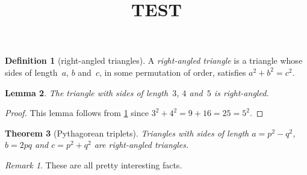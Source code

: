 \documentclass[]{resume-style}
\begin{document}
    \newtheorem{theorem}{Theorem}
    \newtheorem{corollary}[theorem]{Corollary}
    \newtheorem{lemma}[theorem]{Lemma}
    \theoremstyle{definition}
    \newtheorem{definition}[theorem]{Definition}
    \theoremstyle{remark}
    \newtheorem{remark}{Remark}

    \title{TEST}

    \begin{definition}[right-angled triangles] \label{def:tri}
    A \emph{right-angled triangle} is a triangle whose sides of length~\(a\), \(b\) and~\(c\), in some permutation of order, satisfies \(a^2+b^2=c^2\).
    \end{definition}

    \begin{lemma}
    The triangle with sides of length~\(3\), \(4\) and~\(5\) is right-angled.
    \end{lemma}

    \begin{proof}
    This lemma follows from \cref{def:tri} since \(3^2+4^2=9+16=25=5^2\).
    \end{proof}

    \begin{theorem}[Pythagorean triplets] \label{thm:py}
    Triangles with sides of length \(a=p^2-q^2\), \(b=2pq\) and \(c=p^2+q^2\) are right-angled triangles.
    \end{theorem}

    \begin{remark}
    These are all pretty interesting facts.
    \end{remark}


\end{document}
